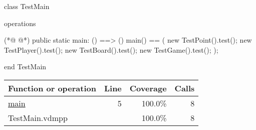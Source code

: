 \begin{vdmpp}[breaklines=true]
class TestMain

operations
 
(*@
\label{main:5}
@*)
 public static main: () ==> ()
 main() ==
 (
  new TestPoint().test();
  new TestPlayer().test();
  new TestBoard().test();
  new TestGame().test();
 );

end TestMain
\end{vdmpp}
\bigskip
\begin{longtable}{|l|r|r|r|}
\hline
Function or operation & Line & Coverage & Calls \\
\hline
\hline
\hyperref[main:5]{main} & 5&100.0\% & 8 \\
\hline
\hline
TestMain.vdmpp & & 100.0\% & 8 \\
\hline
\end{longtable}

